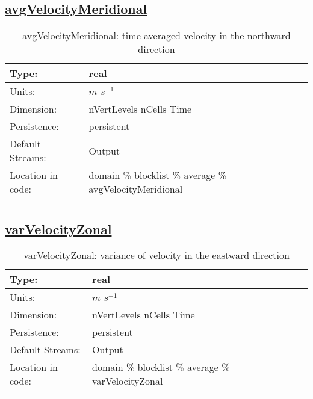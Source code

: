 \subsection[avgVelocityMeridional]{\hyperref[sec:var_tab_average]{avgVelocityMeridional}}
\label{subsec:var_sec_average_avgVelocityMeridional}
\begin{center}
\begin{longtable}{| p{2.0in} | p{4.0in} |}
        \hline 
        Type: & real \\
        \hline 
        Units: & $m$ $s^{-1}$ \\
        \hline 
        Dimension: & nVertLevels nCells Time \\
        \hline 
        Persistence: & persistent \\
        \hline 
		 Default Streams: & Output  \\
        \hline 
		 Location in code: & domain \% blocklist \% average \% avgVelocityMeridional \\
		 \hline 
    \caption{avgVelocityMeridional: time-averaged velocity in the northward direction}
\end{longtable}
\end{center}
\subsection[varVelocityZonal]{\hyperref[sec:var_tab_average]{varVelocityZonal}}
\label{subsec:var_sec_average_varVelocityZonal}
\begin{center}
\begin{longtable}{| p{2.0in} | p{4.0in} |}
        \hline 
        Type: & real \\
        \hline 
        Units: & $m$ $s^{-1}$ \\
        \hline 
        Dimension: & nVertLevels nCells Time \\
        \hline 
        Persistence: & persistent \\
        \hline 
		 Default Streams: & Output  \\
        \hline 
		 Location in code: & domain \% blocklist \% average \% varVelocityZonal \\
		 \hline 
    \caption{varVelocityZonal: variance of velocity in the eastward direction}
\end{longtable}
\end{center}
